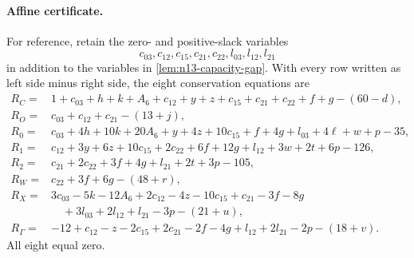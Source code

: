 \paragraph{Affine certificate.}
For reference, retain the zero- and positive-slack variables
\[
 c_{03},c_{12},c_{15},c_{21},c_{22},l_{03},l_{12},l_{21}
\]
in addition to the variables in \cref{lem:n13-capacity-gap}.  With every
row written as left side minus right side, the eight conservation equations
are
\begin{align*}
R_C={}&1+c_{03}+h+k+A_6+c_{12}+y+z+c_{15}+c_{21}+c_{22}+f+g-(60-d),\\
R_O={}&c_{03}+c_{12}+c_{21}-(13+j),\\
R_0={}&c_{03}+4h+10k+20A_6+y+4z+10c_{15}+f+4g
       +l_{03}+4\ell+w+p-35,\\
R_1={}&c_{12}+3y+6z+10c_{15}+2c_{22}+6f+12g
       +l_{12}+3w+2t+6p-126,\\
R_2={}&c_{21}+2c_{22}+3f+4g+l_{21}+2t+3p-105,\\
R_W={}&c_{22}+3f+6g-(48+r),\\
R_X={}&3c_{03}-5k-12A_6+2c_{12}-4z-10c_{15}+c_{21}-3f-8g\\
 &\quad+3l_{03}+2l_{12}+l_{21}-3p-(21+u),\\
R_\Gamma={}&-12+c_{12}-z-2c_{15}+2c_{21}-2f-4g
       +l_{12}+2l_{21}-2p-(18+v).
\end{align*}
All eight equal zero.


